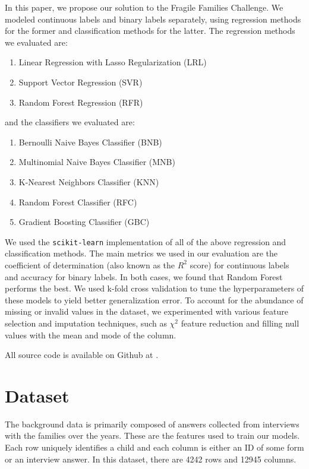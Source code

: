 \documentclass{article} %
\begin{document}
In this paper, we propose our solution to the Fragile Families Challenge. We modeled continuous labels and binary labels separately, using regression methods for the former and classification methods for the latter. The regression methods we evaluated are:

\begin{enumerate}
\item Linear Regression with Lasso Regularization (LRL)
\item Support Vector Regression (SVR)
\item Random Forest Regression (RFR)
\end{enumerate}
and the classifiers we evaluated are:
\begin{enumerate}
\item Bernoulli Naive Bayes Classifier (BNB)
\item Multinomial Naive Bayes Classifier (MNB)
\item K-Nearest Neighbors Classifier (KNN)
\item Random Forest Classifier (RFC)
\item Gradient Boosting Classifier (GBC)
\end{enumerate}

We used the \texttt{scikit-learn} implementation of all of the above regression and classification methods. The main metrics we used in our evaluation are the coefficient of determination (also known as the $R^2$ score) for continuous labels and accuracy for binary labels. In both cases, we found that Random Forest performs the best. We used k-fold cross validation to tune the hyperparameters of these models to yield better generalization error. To account for the abundance of missing or invalid values in the dataset, we experimented with various feature selection and imputation techniques, such as $\chi^2$ feature reduction and filling null values with the mean and mode of the column.

All source code is available on Github at \cite{myrepo}.

\section{Dataset}
\label{sec:dataset}

The background data is primarily composed of answers collected from interviews with the families over the years. These are the features used to train our models. Each row uniquely identifies a child and each column is either an ID of some form or an interview answer. In this dataset, there are 4242 rows and 12945 columns.
\end{document}
